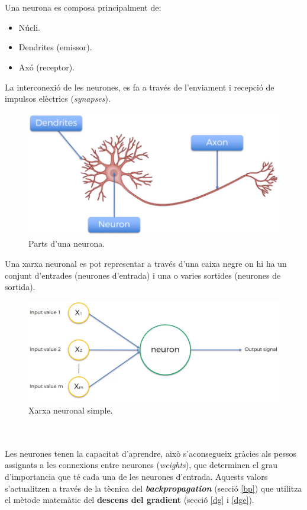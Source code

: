 \documentclass[12pt]{article}
\begin{document}
\\\\Una neurona es composa principalment de:
\begin{itemize}
	\item Núcli.
	\item Dendrites (emissor).
	\item Axó (receptor).
\end{itemize}
La interconexió de les neurones, es fa a través de l'enviament i recepció de impulsos elèctrics (\textit{synapses}).
\pagebreak
\clearpage
\begin{figure}[h!]
	\centering
	\includegraphics[scale=0.4]{imatges/neurona/9parts.png}
	\caption{Parts d'una neurona.}
\end{figure}
Una xarxa neuronal es pot representar a través d'una caixa negre on hi ha un conjunt d'entrades (neurones d'entrada) i una o varies sortides (neurones de sortida).
\begin{figure}[h!]
	\centering
	\includegraphics[scale=0.2]{imatges/neurona/5estructura.png}
	\caption{Xarxa neuronal simple.}
\end{figure}
\\\\Les neurones tenen la capacitat d'aprendre, això s'aconsegueix gràcies als pessos assignats a les connexions entre neurones (\textit{weights}), que determinen el grau d'importancia que té cada una de les neurones d'entrada. Aquests valors s'actualitzen a través de la tècnica del \textbf{\textit{backpropagation}} (secció \ref{bp}) que utilitza el mètode matemàtic del \textbf{descens del gradient} (secció \ref{dg} i \ref{dge}). 
\end{document}
